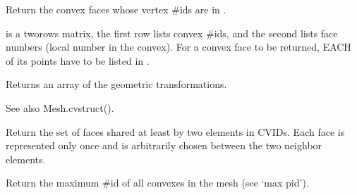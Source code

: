 \documentclass[a4paper,11pt,english]{sphinxmanual}
\begin{document}
\begin{fulllineitems}
\begin{fulllineitems}
\end{fulllineitems}


\begin{fulllineitems}
\label{\detokenize{python/cmdref_Mesh:getfem.Mesh.faces_from_pid}}
Return the convex faces whose vertex \#ids are in .

 is a two\sphinxhyphen{}rows matrix, the first row lists convex \#ids,
and the second lists face numbers (local number in the convex).
For a convex face to be returned, EACH of its points have to be
listed in .

\end{fulllineitems}


\begin{fulllineitems}
\label{\detokenize{python/cmdref_Mesh:getfem.Mesh.geotrans}}
Returns an array of the geometric transformations.

See also Mesh.cvstruct().

\end{fulllineitems}


\begin{fulllineitems}
\label{\detokenize{python/cmdref_Mesh:getfem.Mesh.inner_faces}}
Return the set of faces shared at least by two elements in CVIDs.
Each face is represented only once and is arbitrarily chosen
between the two neighbor elements.

\end{fulllineitems}


\begin{fulllineitems}
\label{\detokenize{python/cmdref_Mesh:getfem.Mesh.max_cvid}}
Return the maximum \#id of all convexes in the mesh (see ‘max pid’).


\end{fulllineitems}
\end{fulllineitems}
\end{document}
